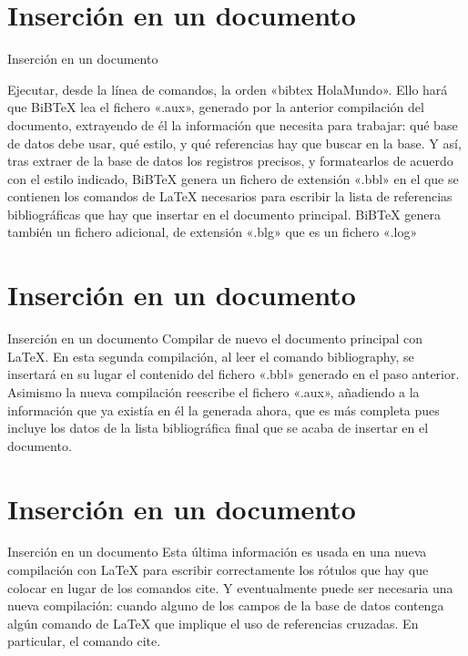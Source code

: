 \documentclass[9pt]{beamer}
\begin{document}
\section{Inserción en un documento}
\begin{frame}{Inserción en un documento}
   
    Ejecutar, desde la línea de comandos, la orden «bibtex HolaMundo». Ello hará que BiBTeX lea el fichero «.aux», generado por la anterior compilación del documento, extrayendo de él la información que necesita para trabajar: qué base de datos debe usar, qué estilo, y qué referencias hay que buscar en la base.
    Y así, tras extraer de la base de datos los registros precisos, y formatearlos de acuerdo con el estilo indicado, BiBTeX genera un fichero de extensión «.bbl» en el que se contienen los comandos de LaTeX necesarios para escribir la lista de referencias bibliográficas que hay que insertar en el documento principal.
    BiBTeX genera también un fichero adicional, de extensión «.blg» que es un fichero «.log»

\end{frame}

\section{Inserción en un documento}
\begin{frame}{Inserción en un documento}
Compilar de nuevo el documento principal con LaTeX. En esta segunda compilación, al leer el comando bibliography, se insertará en su lugar el contenido del fichero «.bbl» generado en el paso anterior. Asimismo la nueva compilación reescribe el fichero «.aux», añadiendo a la información que ya existía en él la generada ahora, que es más completa pues incluye los datos de la lista bibliográfica final que se acaba de insertar en el documento.
\end{frame}

\section{Inserción en un documento}
\begin{frame}{Inserción en un documento}
Esta última información es usada en una nueva compilación con LaTeX para escribir correctamente los rótulos que hay que colocar en lugar de los comandos cite. Y eventualmente puede ser necesaria una nueva compilación: cuando alguno de los campos de la base de datos contenga algún comando de LaTeX que implique el uso de referencias cruzadas. En particular, el comando cite.


\end{frame}
\end{document}
